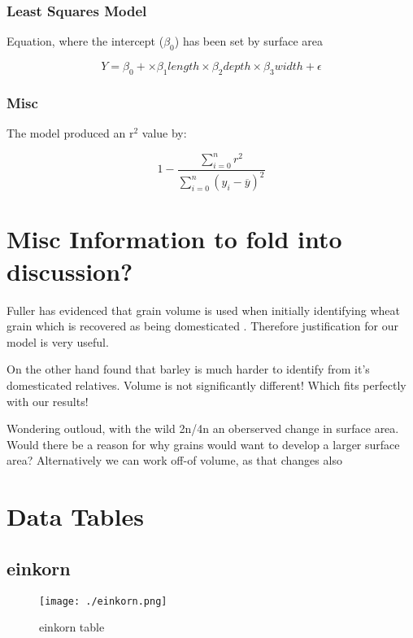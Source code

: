 \documentclass[a4paper]{article}
\begin{document}
\subsubsection{Least Squares Model}
\label{sec:orgdf053ac}

Equation, where the intercept (\(\beta_{\text{0}}\)) has been set by surface area

$$ Y = \beta_0 + \times \beta_1 length \times \beta_2 depth \times \beta_3 width  + \epsilon $$

\subsubsection{Misc}
\label{sec:org2e15438}
The model produced an r\(^{\text{2}}\) value by:

$$1- \frac{\sum\limits_{i=0}^{n}{r^2}}{\sum\limits_{i=0}^{n}{(y_i - \overline{y})^2 }}$$



\section{Misc Information to fold into discussion?}
\label{sec:orgff21b2d}

Fuller has evidenced that grain volume is used when initially identifying wheat grain which is recovered as being domesticated \cite{Fuller2007} .
Therefore justification for our model is very useful.

On the other hand \cite{Willcox2004} found that barley is much harder to identify from it's domesticated relatives.
 Volume is not significantly different! Which fits perfectly with our results!

Wondering outloud, with the wild 2n/4n an oberserved change in surface area. Would there be a
reason for why grains would want to develop a larger surface area? Alternatively we can work off-of volume, as that changes also

\clearpage
\section{Data Tables}
\label{sec:org3ba29ac}

\subsection{einkorn}
\label{sec:org936d935}
\begin{figure}[htbp]
\centering
\texttt{[image: ./einkorn.png]}
\caption{\label{fig:org066959b}
einkorn table}
\end{figure}
\end{document}
